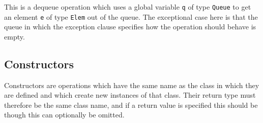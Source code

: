 \documentclass[\pformat,12pt]{article}
\begin{document}
\begin{description}
This is a dequeue operation which uses a global variable {\tt q} of
type {\tt Queue} to get an element {\tt e} of type {\tt Elem} out of
the queue. The exceptional case here is that the queue in
which the exception clause specifies how the operation should
behave is empty.



%
%


\end{description}

\subsection{Constructors}\label{constructors}

Constructors are operations which have the same name as the class in
which they are defined and which create new instances of that
class. Their return type must therefore be the same class
name, and if a return value is specified this should be 
though this can optionally be omitted.
\end{document}
